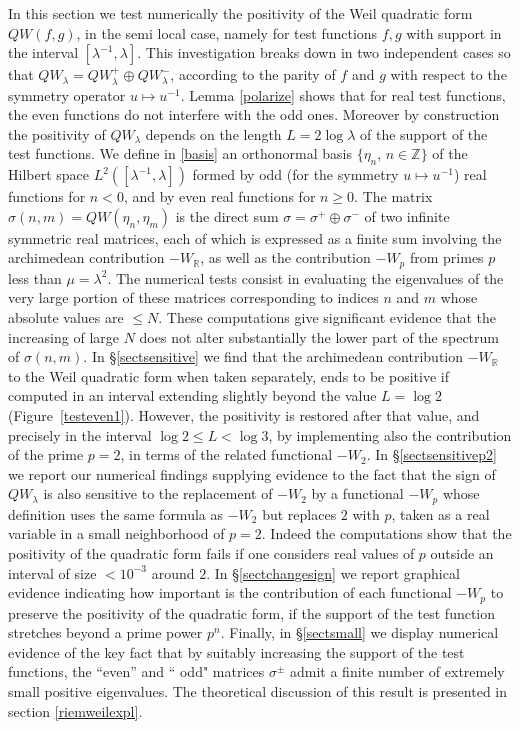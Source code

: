 \documentclass[cupthm]{CUP-JNL-JMJ}
\def\R{{\mathbb R}}
\def\Z{{\mathbb Z}}
\numberwithin{equation}{section}
\theoremstyle{cupplain}
\theoremstyle{cupdefinition}
\theoremstyle{cupremark}
\theoremstyle{cupproof}
\begin{document}
In this section we test numerically the positivity of the Weil quadratic form $QW(f,g)$, in the semi local case, namely for test functions $f,g$ with support in the interval $[\lambda^{-1},\lambda]$. This investigation breaks down in two independent cases so that $QW_\lambda=QW^+_\lambda\oplus QW^-_\lambda$, according  to the parity of  $f$ and $g$ with respect to the symmetry operator $u\mapsto u^{-1}$. Lemma \ref{polarize} shows that for real test functions, the even functions  do not interfere with the odd ones. Moreover by construction the positivity of  $QW_\lambda$ depends on the length $L=2\log \lambda$  of the support of the test functions. We define in \eqref{basis} an orthonormal basis $\{\eta_n$, $n\in \Z\}$ of the Hilbert space $L^2([\lambda^{-1},\lambda])$ formed by odd (for the symmetry $u\mapsto u^{-1}$) real functions for $n<0$, and by even  real functions for $n\geq 0$. The matrix $\sigma(n,m)=QW(\eta_n,\eta_m)$ is the direct sum $\sigma=\sigma^+\oplus \sigma^-$ of two infinite symmetric real matrices, each of which is expressed as a finite sum involving the archimedean contribution $-W_\R$, as well as the contribution $-W_p$    from primes $p$ less than $\mu=\lambda^2$. The numerical tests consist in evaluating the eigenvalues of the very large portion of these matrices
corresponding to indices  $n$ and $m$  whose absolute values are $\leq N$.  These computations give significant evidence that the increasing of large $N$ does not alter substantially the lower part of the spectrum   of  $\sigma(n,m)$.  In \S\ref{sectsensitive} we find that the  archimedean contribution $-W_\R$ to the Weil quadratic form  when  taken separately, ends to be positive if  computed    in an interval extending slightly  beyond the value $L=\log 2$ (Figure~\ref{testeven1}). However, the  positivity  is restored after that value, and precisely in the interval $\log 2\le L<\log 3$, by implementing also the contribution of the prime $p=2$, in terms of the related functional $-W_2$. In \S\ref{sectsensitivep2} we  report our numerical findings supplying evidence to the fact that the sign of  $QW_\lambda$ is  also sensitive  to the replacement of   $-W_2$ by a functional $-W_p$  whose definition uses the same formula as $-W_2$ but replaces $2$ with $p$,  taken  as a real variable in a small neighborhood of $p=2$. Indeed the  computations show  that the positivity of the quadratic form fails if one considers  real values of $p$ outside an interval of size $<10^{-3}$ around $2$. In \S\ref{sectchangesign} we  report graphical evidence indicating how important is the contribution of each  functional $-W_p$ to preserve the positivity of the quadratic form, if the support of the test function stretches beyond a prime power $p^n$. Finally, in \S\ref{sectsmall} we display numerical evidence of the key fact that by suitably increasing the support of the test functions, the ``even'' and `` odd" matrices  $\sigma^\pm$   admit a finite number of extremely small positive eigenvalues.  The theoretical discussion of this result is presented in section \ref{riemweilexpl}.
\end{document}
